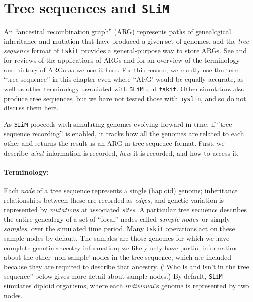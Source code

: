 \documentclass[12pt]{article}
\newcommand{\tskit}[0]{\texttt{tskit}\xspace}
\newcommand{\slim}[0]{\texttt{SLiM}\xspace}
\newcommand{\pyslim}[0]{\texttt{pyslim}\xspace}
\begin{document}
\section{Tree sequences and \slim}
An ``ancestral recombination graph'' (ARG)
represents paths of genealogical inheritance and mutation that have produced a given set of genomes,
and the \emph{tree sequence} format of \tskit provides a general-purpose way to store ARGs.
See \cite{lewanski2024introduction} and \citet{brandt2022evaluation} for reviews of the applications of ARGs
and \citet{wong_general_2024} for an overview of the terminology and history of ARGs as we use it here.
For this reason, we mostly use the term ``tree sequence'' in this chapter even where ``ARG'
would be equally accurate, as well as other terminology associated with \slim and \tskit \citep{kelleher_efficient_2016,ralph_efficiently_2020,wong_general_2024}.
Other simulators also produce tree sequences,
but we have not tested those with \pyslim, and so do not discuss them here.

As \slim proceeds with simulating genomes evolving forward-in-time, 
if ``tree sequence recording'' is enabled,
it tracks how all the genomes are
related to each other and returns the result as an ARG in tree sequence format. First, we describe
\emph{what} information is recorded, \emph{how} it is recorded, and how to access it.

\paragraph{Terminology:}
Each \textit{node} of a tree sequence represents a single (haploid) genome;
inheritance relationships between these are recorded as \textit{edges},
and genetic variation is represented by \textit{mutations} at associated \textit{sites}.
A particular tree sequence describes the entire genealogy of a set of ``focal'' nodes called
\textit{sample nodes}, or simply \textit{samples}, over the simulated time period.
Many \tskit operations act on these sample nodes by default.
The samples are those genomes for which we have complete genetic ancestry information; 
we likely only have partial information about the other 'non-sample' nodes in the tree sequence,
which are included because they are required to describe that ancestry.
(``Who is and isn't in the tree sequence'' below gives more detail about sample nodes.)
By default, \slim simulates diploid organisms, where each \textit{individual}'s genome is represented by two nodes.
\end{document}
